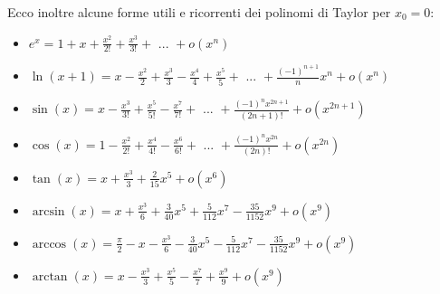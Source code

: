 Ecco inoltre alcune forme utili e ricorrenti dei polinomi di Taylor per $x_0=0$:
\begin{itemize}
    \item $e^x=1+x+\frac{x^2}{2!}+\frac{x^3}{3!}+\text{ ... }+o(x^{n})$
    \item $\ln(x+1)=x-\frac{x^2}{2}+\frac{x^3}{3}-\frac{x^4}{4}+\frac{x^5}{5}+\text{ ... }+\frac{(-1)^{n+1}}{n}x^n+o(x^{n})$
    \item $\sin(x)=x-\frac{x^3}{3!}+\frac{x^5}{5!}-\frac{x^7}{7!}+\text{ ... }+\frac{(-1)^nx^{2n+1}}{(2n+1)!}+o(x^{2n+1})$
    \item $\cos(x)=1-\frac{x^2}{2!}+\frac{x^4}{4!}-\frac{x^6}{6!}+\text{ ... }+\frac{(-1)^nx^{2n}}{(2n)!}+o(x^{2n})$
    \item $\tan(x)=x+\frac{x^3}{3}+\frac{2}{15}x^5+o(x^6)$
    \item $\arcsin(x)=x+\frac{x^3}{6}+\frac{3}{40}x^5+\frac{5}{112}x^7-\frac{35}{1152}x^9+o(x^9)$
    \item $\arccos(x)=\frac{\pi}{2}-x-\frac{x^3}{6}-\frac{3}{40}x^5-\frac{5}{112}x^7-\frac{35}{1152}x^9+o(x^9)$
    \item $\arctan(x)=x-\frac{x^3}{3}+\frac{x^5}{5}-\frac{x^7}{7}+\frac{x^9}{9}+o(x^9)$
\end{itemize}